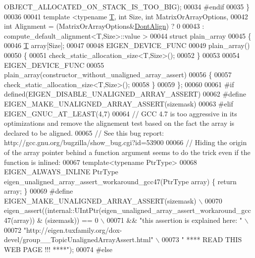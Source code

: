 \begin{DoxyCode}
      OBJECT\_ALLOCATED\_ON\_STACK\_IS\_TOO\_BIG);
00034 \textcolor{preprocessor}{  #endif}
00035 \}
00036 
00041 \textcolor{keyword}{template} <\textcolor{keyword}{typename} \hyperlink{group___sparse_core___module_class_eigen_1_1_triplet}{T}, \textcolor{keywordtype}{int} Size, \textcolor{keywordtype}{int} MatrixOrArrayOptions,
00042           \textcolor{keywordtype}{int} Alignment = (MatrixOrArrayOptions&\hyperlink{group__enums_ggaacded1a18ae58b0f554751f6cdf9eb13a40a452614141522dd313363dbbd65726}{DontAlign}) ? 0
00043                         : compute\_default\_alignment<T,Size>::value >
00044 \textcolor{keyword}{struct} plain\_array
00045 \{
00046   \hyperlink{group___sparse_core___module_class_eigen_1_1_triplet}{T} array[Size];
00047 
00048   EIGEN\_DEVICE\_FUNC
00049   plain\_array()
00050   \{ 
00051     check\_static\_allocation\_size<T,Size>();
00052   \}
00053 
00054   EIGEN\_DEVICE\_FUNC
00055   plain\_array(constructor\_without\_unaligned\_array\_assert)
00056   \{ 
00057     check\_static\_allocation\_size<T,Size>();
00058   \}
00059 \};
00060 
00061 \textcolor{preprocessor}{#if defined(EIGEN\_DISABLE\_UNALIGNED\_ARRAY\_ASSERT)}
00062 \textcolor{preprocessor}{  #define EIGEN\_MAKE\_UNALIGNED\_ARRAY\_ASSERT(sizemask)}
00063 \textcolor{preprocessor}{#elif EIGEN\_GNUC\_AT\_LEAST(4,7) }
00064   \textcolor{comment}{// GCC 4.7 is too aggressive in its optimizations and remove the alignement test based on the fact the
       array is declared to be aligned.}
00065   \textcolor{comment}{// See this bug report: http://gcc.gnu.org/bugzilla/show\_bug.cgi?id=53900}
00066   \textcolor{comment}{// Hiding the origin of the array pointer behind a function argument seems to do the trick even if the
       function is inlined:}
00067   \textcolor{keyword}{template}<\textcolor{keyword}{typename} PtrType>
00068   EIGEN\_ALWAYS\_INLINE PtrType eigen\_unaligned\_array\_assert\_workaround\_gcc47(PtrType array) \{ \textcolor{keywordflow}{return} array; 
      \}
00069 \textcolor{preprocessor}{  #define EIGEN\_MAKE\_UNALIGNED\_ARRAY\_ASSERT(sizemask) \(\backslash\)}
00070 \textcolor{preprocessor}{    eigen\_assert((internal::UIntPtr(eigen\_unaligned\_array\_assert\_workaround\_gcc47(array)) & (sizemask)) ==
       0 \(\backslash\)}
00071 \textcolor{preprocessor}{              && "this assertion is explained here: " \(\backslash\)}
00072 \textcolor{preprocessor}{              "http://eigen.tuxfamily.org/dox-devel/group\_\_TopicUnalignedArrayAssert.html" \(\backslash\)}
00073 \textcolor{preprocessor}{              " **** READ THIS WEB PAGE !!! ****");}
00074 \textcolor{preprocessor}{#else}

\end{DoxyCode}
